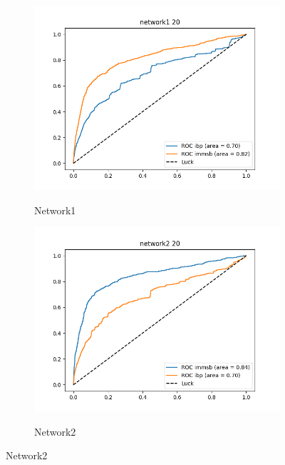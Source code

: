 
\begin{figure}[h]
        \centering
        \begin{subfigure}[b]{0.300\textwidth}
            \centering
            \includegraphics[width=\textwidth]{img/corpus/roc_network1_20}
            \label{fig:mean and std of net14}
            \caption {{\small Network1}}    
        \end{subfigure}
        \begin{subfigure}[b]{0.300\textwidth}
            \centering
            \includegraphics[width=\textwidth]{img/corpus/roc_network2_20}
            \label{fig:mean and std of net14}
            \caption {{\small Network2}}    
        \end{subfigure}

\end{figure}
